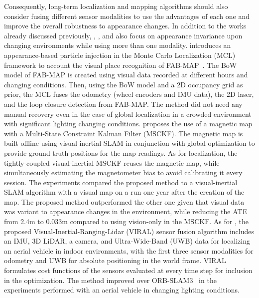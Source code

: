 Consequently, long-term localization and mapping algorithms should also consider fusing different sensor modalities to use the advantages of each one and improve the overall robustness to appearance changes. In addition to the works already discussed previously, \cite{pérez-et-al:2015:y}, \cite{coulin-et-al:2022:3136241}, and \cite{nguyen-et-al:2022:3094157} also focus on appearance invariance upon changing environments while using more than one modality.
\cite{pérez-et-al:2015:y} introduces an appearance-based particle injection in the Monte Carlo Localization (MCL) framework to account the visual place recognition of FAB-MAP~\parencite{discussion:fab-map}. The BoW~\parencite{discussion:bow} model of FAB-MAP is created using visual data recorded at different hours and changing conditions. Then, using the BoW model and a 2D occupancy grid as prior, the MCL fuses the odometry (wheel encoders and IMU data), the 2D laser, and the loop closure detection from FAB-MAP. The method did not need any manual recovery even in the case of global localization in a crowded environment with significant lighting changing conditions.
\cite{coulin-et-al:2022:3136241} proposes the use of a magnetic map with a Multi-State Constraint Kalman Filter (MSCKF). The magnetic map is built offline using visual-inertial SLAM in conjunction with global optimization to provide ground-truth positions for the map readings. As for localization, the tightly-coupled visual-inertial MSCKF reuses the magnetic map, while simultaneously estimating the magnetometer bias to avoid calibrating it every session. The experiments compared the proposed method to a visual-inertial SLAM algorithm with a visual map on a run one year after the creation of the map. The proposed method outperformed the other one given that visual data was variant to appearance changes in the environment, while reducing the ATE from 2.4m to 0.033m compared to using vision-only in the MSCKF.
As for \cite{nguyen-et-al:2022:3094157}, the proposed Visual-Inertial-Ranging-Lidar (VIRAL) sensor fusion algorithm includes an IMU, 3D LiDAR, a camera, and Ultra-Wide-Band (UWB) data for localizing an aerial vehicle in indoor environments, with the first three sensor modalities for odometry and UWB for absolute positioning in the world frame. VIRAL formulates cost functions of the sensors evaluated at every time step for inclusion in the optimization. The method improved over ORB-SLAM3~\parencite{discussion:orb-slam3} in the experiments performed with an aerial vehicle in changing lighting conditions.





